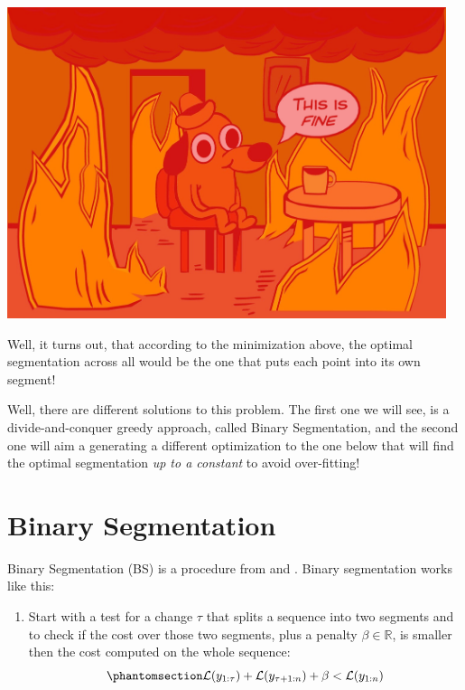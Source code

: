 \documentclass[
  letterpaper,
  DIV=11,
  numbers=noendperiod]{scrreprt}
\providecommand{\tightlist}{%
  \setlength{\itemsep}{0pt}\setlength{\parskip}{0pt}}\usepackage{longtable,booktabs,array}
\begin{document}
\begin{center}
\includegraphics[width=5.0625in,height=\textheight]{source_imgs/fine.png}
\end{center}

Well, it turns out, that according to the minimization above, the
optimal segmentation across all would be the one that puts each point
into its own segment!

Well, there are different solutions to this problem. The first one we
will see, is a divide-and-conquer greedy approach, called Binary
Segmentation, and the second one will aim a generating a different
optimization to the one below that will find the optimal segmentation
\emph{up to a constant} to avoid over-fitting!

\section{Binary Segmentation}\label{binary-segmentation}

Binary Segmentation (BS) is a procedure from \cite{scott1974cluster} and
\cite{sen1975tests}. Binary segmentation works like this:

\begin{enumerate}
\def\labelenumi{\arabic{enumi}.}
\tightlist
\item
  Start with a test for a change \(\tau\) that splits a sequence into
  two segments and to check if the cost over those two segments, plus a
  penalty \(\beta \in \mathbb{R}\), is smaller then the cost computed on
  the whole sequence:
  \begin{equation}\phantomsection\label{eq-bin_seg_condition}{
      \mathcal{L}(y_{1:\tau}) + \mathcal{L}(y_{\tau+1:n}) + \beta < \mathcal{L}(y_{1:n})     
  }\end{equation}
\end{enumerate}
\end{document}
